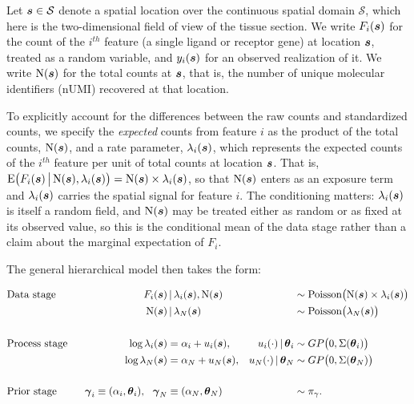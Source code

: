 \documentclass[10pt,letterpaper]{article}
\begin{document}
Let $\mbox{\boldmath $s$}\in\mathcal{S}$ denote a spatial location over the continuous spatial domain $\mathcal{S}$, which here is the two-dimensional field of view of the tissue section. We write $F_i(\mbox{\boldmath $s$})$ for the count of the $i^{th}$ feature (a single ligand or receptor gene) at location $\mbox{\boldmath $s$}$, treated as a random variable, and $y_i(\mbox{\boldmath $s$})$ for an observed realization of it. We write $\mbox{N}(\mbox{\boldmath $s$})$ for the total counts at $\mbox{\boldmath $s$}$, that is, the number of unique molecular identifiers (nUMI) recovered at that location.

To explicitly account for the differences between the raw counts and standardized counts, we specify the \textit{expected} counts from feature $i$ as the product of the total counts, $\mbox{N}(\mbox{\boldmath $s$})$, and a rate parameter, $\lambda_i(\mbox{\boldmath $s$})$, which represents the expected counts of the $i^{th}$ feature per unit of total counts at location $\mbox{\boldmath $s$}$. That is, $\mbox{E}\big(F_i(\mbox{\boldmath $s$})\,\big|\,\mbox{N}(\mbox{\boldmath $s$}), \lambda_i(\mbox{\boldmath $s$})\big) = \mbox{N}(\mbox{\boldmath $s$})\times \lambda_i(\mbox{\boldmath $s$})$, so that $\mbox{N}(\mbox{\boldmath $s$})$ enters as an exposure term and $\lambda_i(\mbox{\boldmath $s$})$ carries the spatial signal for feature $i$. The conditioning matters: $\lambda_i(\mbox{\boldmath $s$})$ is itself a random field, and $\mbox{N}(\mbox{\boldmath $s$})$ may be treated either as random or as fixed at its observed value, so this is the conditional mean of the data stage rather than a claim about the marginal expectation of $F_i$.

The general hierarchical model then takes the form:

\begin{equation}
\label{eq:one-feat-model}
\begin{alignedat}{999}
& \mbox{Data stage} & F_i(\bs) & \, | \, \lambda_i(\bs), \N(\bs) & &\sim \mbox{Poisson}\big( \N(\bs)\times\lambda_i(\bs)\big)\\
& & \N(\bs) & \, | \, \lambda_N(\bs) & &\sim \mbox{Poisson}\big( \lambda_N(\bs)\big)\\
&&&&&\\
&\mbox{Process stage} \ \ \ \ \ & \mbox{log}\,\lambda_i(\bs)& = \alpha_i + u_i(\bs), \ \ \ & u_i(\cdot)\,|\,\btheta_i &\sim GP\big(0, \Sigma(\btheta_i)\big)\\
&\ \ \ \ \ & \mbox{log}\,\lambda_N(\bs)& = \alpha_N + u_N(\bs), \ \ \ & u_N(\cdot)\,|\,\btheta_N &\sim GP\big(0, \Sigma(\btheta_N)\big)\\
&&&&&\\
&\mbox{Prior stage} & \bgamma_i \equiv (\alpha_i,\btheta_i), \ \ \bgamma_N &\equiv (\alpha_N,\btheta_N) & &\sim \pi_\gamma.
\end{alignedat}
\end{equation}
\end{document}
